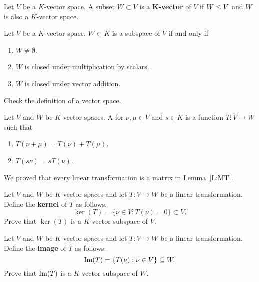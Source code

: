 \documentclass{ximera}
\begin{document}
\begin{definition}
  Let $V$ be a $K$-vector space. A subset $W\subset V$ is a
  \textbf{$\boldsymbol K$-vector}  of $V$ if $W\leq V$ and $W$
  is also a $K$-vector space.
\end{definition}

\begin{lemma}
  Let $V$ be a $K$-vector space. $W\subset K$ is a subspace of $V$ if
  and only if
  \begin{enumerate}
  \item $W\ne \emptyset$.
  \item $W$ is closed under multiplication by scalars.
  \item $W$ is closed under vector addition.
  \end{enumerate}
  \begin{sketch}
    Check the definition of a vector space.
  \end{sketch}
\end{lemma}

\begin{definition}
  Let $V$ and $W$ be $K$-vector spaces. A 
  for $\nu,\mu\in V$ and $s\in K$ is a function $T:V\to W$ such that
    \begin{enumerate}
    \item $T(\nu+\mu) = T(\nu)+T(\mu)$.
    \item $T(s \nu) = sT(\nu)$.
    \end{enumerate}
\end{definition}

\begin{remark}
  We proved that every linear transformation is a matrix in
  Lemma~\ref{L:MT}.
\end{remark}

\begin{exercise}
  Let $V$ and $W$ be $K$-vector spaces and let $T:V\to W$ be a linear
  transformation. Define the \textbf{kernel} of $T$ as follows:
  \[
  \ker(T) = \{\nu\in V: T(\nu) = 0\}\subset V.
  \]
  Prove that $\ker(T)$ is a $K$-vector subspace of $V$.
\end{exercise}

\begin{exercise}
  Let $V$ and $W$ be $K$-vector spaces and let $T:V\to W$ be a linear
  transformation. Define the \textbf{image} of $T$ as follows:
  \[
  \operatorname{Im}(T) = \{T(\nu): \nu\in V\}\subseteq W.
  \]
  Prove that $\operatorname{Im}(T)$ is a $K$-vector subspace of $W$.
\end{exercise}
\end{document}
